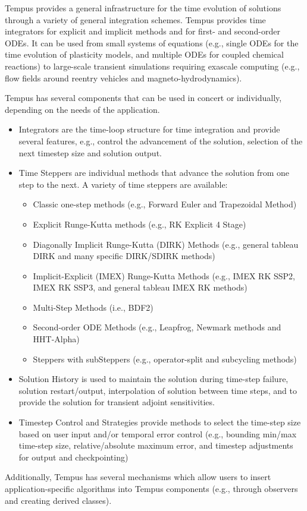 Tempus provides a general infrastructure for the time evolution of
solutions through a variety of general integration schemes.  Tempus
provides time integrators for explicit and implicit methods and for
first- and second-order ODEs.  It can be used from small systems of
equations (e.g., single ODEs for the time evolution of plasticity
models, and multiple ODEs for coupled chemical reactions) to
large-scale transient simulations requiring exascale computing
(e.g., flow fields around reentry vehicles and magneto-hydrodynamics).

Tempus has several components that can be used in concert or
individually, depending on the needs of the application.
\begin{itemize}
  \item Integrators are the time-loop structure for time integration
  and provide several features, e.g., control the advancement of
  the solution, selection of the next timestep size and solution
  output.

  \item Time Steppers are individual methods that advance the
  solution from one step to the next.  A variety of time steppers
  are available:
  \begin{itemize}
    \item Classic one-step methods (e.g., Forward Euler and Trapezoidal
    Method)
    \item Explicit Runge-Kutta methods (e.g., RK Explicit 4 Stage)
    \item Diagonally Implicit Runge-Kutta (DIRK) Methods (e.g.,
    general tableau DIRK and many specific DIRK/SDIRK methods)
    \item Implicit-Explicit (IMEX) Runge-Kutta Methods (e.g., IMEX
    RK SSP2, IMEX RK SSP3, and general tableau IMEX RK methods)
    \item Multi-Step Methods (i.e., BDF2)
    \item Second-order ODE Methods (e.g., Leapfrog, Newmark methods
    and HHT-Alpha)
    \item Steppers with subSteppers (e.g., operator-split and
    subcycling methods)
  \end{itemize}

  \item Solution History is used to maintain the solution during
  time-step failure, solution restart/output, interpolation of
  solution between time steps, and to provide the solution for
  transient adjoint sensitivities.

  \item Timestep Control and Strategies provide methods to select
  the time-step size based on user input and/or temporal error
  control (e.g., bounding min/max time-step size, relative/absolute
  maximum error, and timestep adjustments for output and checkpointing)

\end{itemize}
Additionally, Tempus has several mechanisms which allow users to
insert application-specific algorithms into Tempus components (e.g.,
through observers and creating derived classes).

